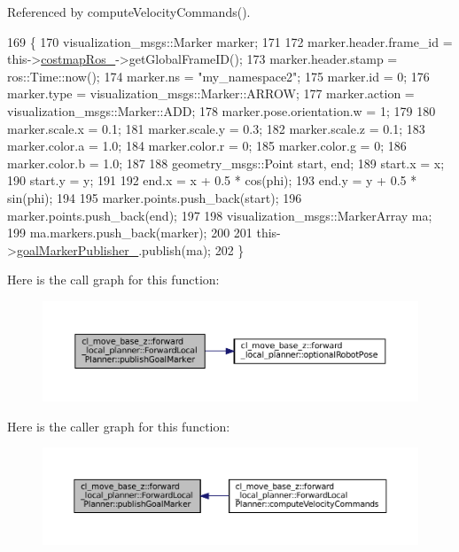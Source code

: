 Referenced by compute\+Velocity\+Commands().


\begin{DoxyCode}
169 \{
170     visualization\_msgs::Marker marker;
171 
172     marker.header.frame\_id = this->\hyperlink{classcl__move__base__z_1_1forward__local__planner_1_1ForwardLocalPlanner_a37791fea67ce92c6e38e3727311e533b}{costmapRos\_}->getGlobalFrameID();
173     marker.header.stamp = ros::Time::now();
174     marker.ns = \textcolor{stringliteral}{"my\_namespace2"};
175     marker.id = 0;
176     marker.type = visualization\_msgs::Marker::ARROW;
177     marker.action = visualization\_msgs::Marker::ADD;
178     marker.pose.orientation.w = 1;
179     
180     marker.scale.x = 0.1;
181     marker.scale.y = 0.3;
182     marker.scale.z = 0.1;
183     marker.color.a = 1.0;
184     marker.color.r = 0;
185     marker.color.g = 0;
186     marker.color.b = 1.0;
187 
188     geometry\_msgs::Point start, end;
189     start.x = x;
190     start.y = y;
191 
192     end.x = x + 0.5 * cos(phi);
193     end.y = y + 0.5 * sin(phi);
194 
195     marker.points.push\_back(start);
196     marker.points.push\_back(end);
197 
198     visualization\_msgs::MarkerArray ma;
199     ma.markers.push\_back(marker);
200 
201     this->\hyperlink{classcl__move__base__z_1_1forward__local__planner_1_1ForwardLocalPlanner_a0d94f4e35c44faacd9d795a303193369}{goalMarkerPublisher\_}.publish(ma);
202 \}
\end{DoxyCode}
Here is the call graph for this function\+:
\nopagebreak
\begin{figure}[H]
\begin{center}
\leavevmode
\includegraphics[width=350pt]{classcl__move__base__z_1_1forward__local__planner_1_1ForwardLocalPlanner_ae2ef5a1d00495eb7a6c22ec35ab8baf2_cgraph}
\end{center}
\end{figure}
Here is the caller graph for this function\+:
\nopagebreak
\begin{figure}[H]
\begin{center}
\leavevmode
\includegraphics[width=350pt]{classcl__move__base__z_1_1forward__local__planner_1_1ForwardLocalPlanner_ae2ef5a1d00495eb7a6c22ec35ab8baf2_icgraph}
\end{center}
\end{figure}
